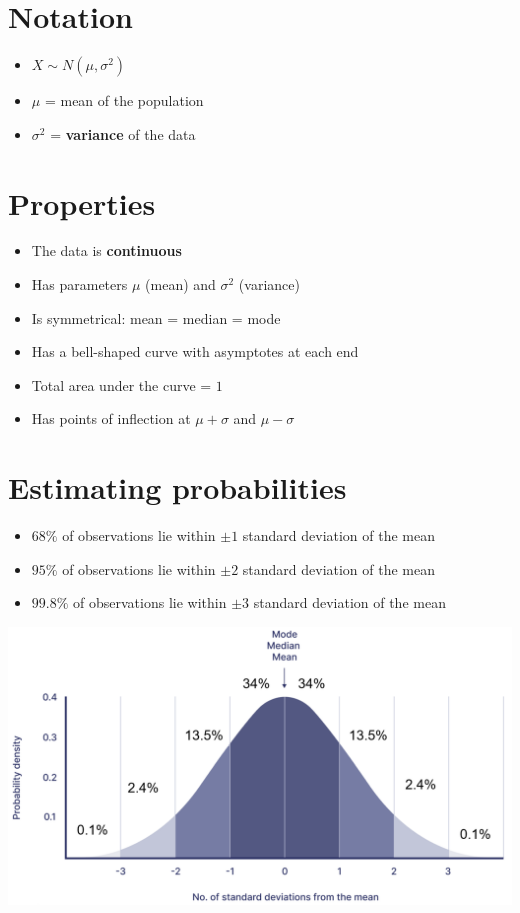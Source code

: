 \section{Notation}
\begin{itemize}
    \item $X \sim N(\mu,\sigma^2)$
    \item $\mu$ = mean of the population
    \item $\sigma^2$ = \textbf{variance} of the data
\end{itemize}
\section{Properties}
\begin{itemize}
    \item The data is \textbf{continuous}
    \item Has parameters $\mu$ (mean) and $\sigma^2$ (variance)
    \item Is symmetrical: mean = median = mode
    \item Has a bell-shaped curve with asymptotes at each end
    \item Total area under the curve = $1$
    \item Has points of inflection at $\mu+\sigma$ and $\mu-\sigma$
\end{itemize}

\section{Estimating probabilities}
\begin{itemize}
    \item $68\%$ of observations lie within $\pm 1$ standard deviation of the mean
    \item $95\%$ of observations lie within $\pm 2$ standard deviation of the mean
    \item $99.8\%$ of observations lie within $\pm 3$ standard deviation of the mean
\end{itemize}
\includegraphics[width=0.7\linewidth]{images/normal_estimate}


